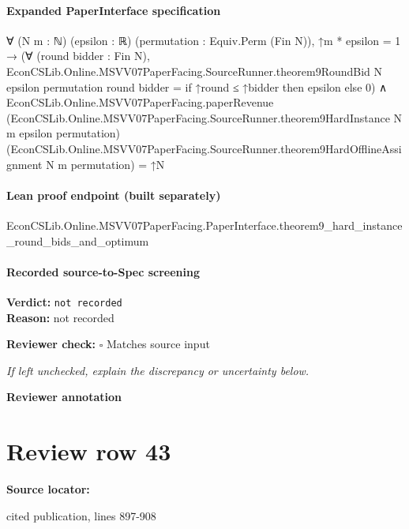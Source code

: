 \documentclass[10pt]{article}
\newcommand{\reviewerbox}{%
  \par\noindent\fbox{\parbox{0.96\linewidth}{\rule{0pt}{0.38in}}}\par
}
\newcommand{\reviewmatch}[1]{%
  \par\noindent\textbf{Reviewer check:} $\square$\; #1\par
  \noindent\emph{If left unchecked, explain the discrepancy or uncertainty below.}\par
}
\begin{document}
\paragraph{Expanded PaperInterface specification}
\begin{ReviewVerbatim}
∀ (N m : ℕ) (epsilon : ℝ) (permutation : Equiv.Perm (Fin N)),
  ↑m * epsilon = 1 →
    (∀ (round bidder : Fin N),
        EconCSLib.Online.MSVV07PaperFacing.SourceRunner.theorem9RoundBid N epsilon permutation round bidder =
          if ↑round ≤ ↑bidder then epsilon else 0) ∧
      EconCSLib.Online.MSVV07PaperFacing.paperRevenue
          (EconCSLib.Online.MSVV07PaperFacing.SourceRunner.theorem9HardInstance N m epsilon permutation)
          (EconCSLib.Online.MSVV07PaperFacing.SourceRunner.theorem9HardOfflineAssignment N m permutation) =
        ↑N
\end{ReviewVerbatim}

\paragraph{Lean proof endpoint (built separately)}\begin{ReviewVerbatim}
EconCSLib.Online.MSVV07PaperFacing.PaperInterface.theorem9_hard_instance_round_bids_and_optimum
\end{ReviewVerbatim}

\paragraph{Recorded source-to-Spec screening}
\textbf{Verdict:} \texttt{not recorded}
\\
\textbf{Reason:} not recorded
\reviewmatch{Matches source input}
\noindent\textbf{Reviewer annotation}\par
\reviewerbox
\clearpage
\hypertarget{source-claim-46ca155d3d47fb7a}{}
\section*{Review row 43}
\textbf{Source locator:} {\footnotesize\raggedright cited publication, lines 897-\allowbreak{}908\par}
\end{document}
